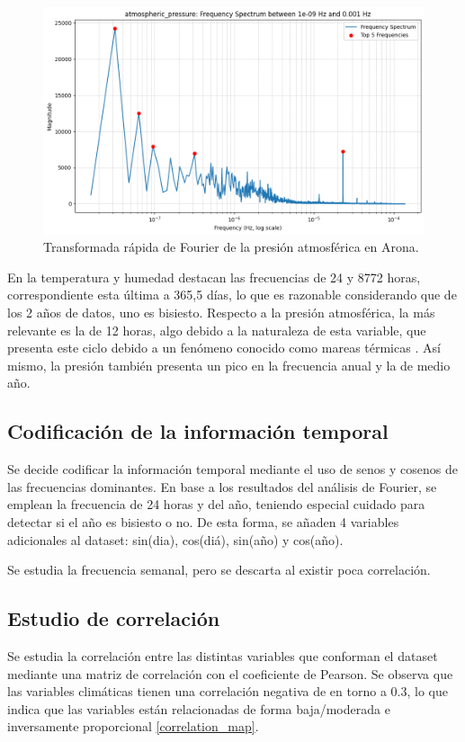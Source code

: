  \begin{figure}
    \centering
    \includegraphics[width=.5\linewidth]{images/fft_pressure.png}
    \caption{Transformada rápida de Fourier de la presión atmosférica en Arona.}
    \label{fft_pressure}
\end{figure}



En la temperatura y humedad destacan las frecuencias de 24 y 8772 horas, correspondiente esta última a 365,5 días, lo que es razonable considerando que de los 
2 años de datos, uno es bisiesto. Respecto a la presión atmosférica, la más relevante es la de 12 horas, algo debido a la naturaleza de esta variable, 
que presenta este ciclo debido a un fenómeno conocido como mareas térmicas \cite{ChapmanLindzen1970}. Así mismo, la presión también presenta un pico en la frecuencia anual y la de medio año.


\subsection{Codificación de la información temporal}
Se decide codificar la información temporal mediante el uso de senos y cosenos de las frecuencias dominantes.
En base a los resultados del análisis de Fourier, se emplean la frecuencia de 24 horas y del año, teniendo especial cuidado para detectar
    si el año es bisiesto o no. De esta forma, se añaden 4 variables adicionales al dataset: sin(dia), cos(diá), sin(año) y cos(año).

Se estudia la frecuencia semanal, pero se descarta al existir poca correlación.

\subsection{Estudio de correlación}
Se estudia la correlación entre las distintas variables que conforman el dataset mediante una matriz de correlación con el coeficiente de Pearson.
Se observa que las variables climáticas tienen una correlación negativa de en torno a 0.3, lo que indica que las variables están relacionadas de 
forma baja/moderada e inversamente proporcional \ref{correlation_map}.

